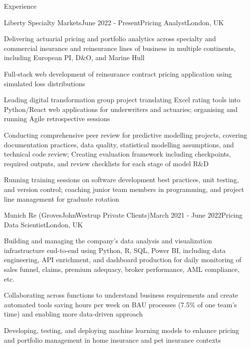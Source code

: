 \documentclass{resume} %
\begin{document}
\begin{rSection}{Experience}
	
\begin{rSubsection}{Liberty Specialty Markets}{June 2022 - Present}{Pricing Analyst}{London, UK}
	\item Delivering actuarial pricing and portfolio analytics across specialty and commercial insurance and reinsurance lines of business in multiple continents, including European PI, D\&O, and Marine Hull
	\item Full-stack web development of reinsurance contract pricing application using simulated loss distributions
	\item Leading digital transformation group project translating Excel rating tools into Python/React web applications for underwriters and actuaries; organising and running Agile retrospective sessions
	\item Conducting comprehensive peer review for predictive modelling projects, covering documentation practices, data quality, statistical modelling assumptions, and technical code review; Creating evaluation framework including checkpoints, required outputs, and review checklists for each stage of model R\&D
	\item Running training sessions on software development best practices, unit testing, and version control; coaching junior team members in programming, and project line management for graduate rotation
\end{rSubsection}


\begin{rSubsection}{Munich Re (GrovesJohnWestrup Private Clients)}{March 2021 - June 2022}{Pricing Data Scientist}{London, UK}
	\item Building and managing the company's data analysis and visualization infrastructure end-to-end using Python, R, SQL, Power BI, including data engineering, API enrichment, and dashboard production for daily monitoring of sales funnel, claims, premium adequacy, broker performance, AML compliance, etc.
	\item Collaborating across functions to understand business requirements and create automated tools saving hours per week on BAU processes (7.5\% of one team's time) and enabling more data-driven approach
	\item Developing, testing, and deploying machine learning models to enhance pricing and portfolio management in home insurance and pet insurance contexts
\end{rSubsection}


\end{rSection}
\end{document}
